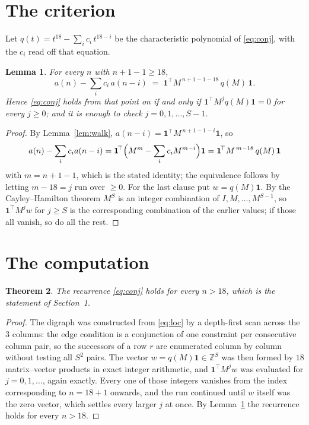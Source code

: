 \documentclass[11pt,a4paper]{article}
\theoremstyle{plain}
\newtheorem{theorem}{Theorem}
\newtheorem{lemma}[theorem]{Lemma}
\theoremstyle{definition}
\begin{document}
\section{The criterion}

Let $q(t)=t^{18}-\sum_i c_i\,t^{18-i}$ be the characteristic polynomial of
\eqref{eq:conj}, with the $c_i$ read off that equation.

\begin{lemma}\label{lem:crit}
For every $n$ with $n+1-1\ge18$,
\[
a(n)-\sum_i c_i\,a(n-i)\;=\;\mathbf{1}^{\!\top}M^{\,n+1-1-18}\,q(M)\,\mathbf{1} .
\]
Hence \eqref{eq:conj} holds from that point on if and only if
$\mathbf{1}^{\!\top}M^{j}q(M)\mathbf{1}=0$ for every $j\ge0$; and it is enough to check
$j=0,1,\dots,S-1$.
\end{lemma}

\begin{proof}
By Lemma~\ref{lem:walk}, $a(n-i)=\mathbf{1}^{\!\top}M^{\,n+1-1-i}\mathbf{1}$, so
\[
a(n)-\sum_i c_i a(n-i)
=\mathbf{1}^{\!\top}\Bigl(M^{m}-\sum_i c_i M^{m-i}\Bigr)\mathbf{1}
=\mathbf{1}^{\!\top}M^{\,m-18}\,q(M)\,\mathbf{1}
\]
with $m=n+1-1$, which is the stated identity; the equivalence follows by letting
$m-18=j$ run over $\ge0$. For the last clause put $w=q(M)\mathbf{1}$. By the
Cayley--Hamilton theorem $M^{S}$ is an integer combination of $I,M,\dots,M^{S-1}$, so
$\mathbf{1}^{\!\top}M^{j}w$ for $j\ge S$ is the corresponding combination of the earlier
values; if those all vanish, so do all the rest.
\end{proof}

\section{The computation}

\begin{theorem}
The recurrence \eqref{eq:conj} holds for every $n>18$, which is the statement of
Section~1.
\end{theorem}

\begin{proof}
The digraph was constructed from \eqref{eq:loc} by a depth-first scan across the $3$
columns: the edge condition is a conjunction of one constraint per consecutive column
pair, so the successors of a row $r$ are enumerated column by column without testing all
$S^2$ pairs. The vector $w=q(M)\mathbf{1}\in\mathbb{Z}^{S}$ was then formed by $18$
matrix--vector products in exact integer arithmetic, and $\mathbf{1}^{\!\top}M^{j}w$ was
evaluated for $j=0,1,\dots$, again exactly. Every one of those integers vanishes from the
index corresponding to $n=18+1$ onwards, and the run continued until $w$ itself was the
zero vector, which settles every larger $j$ at once. By Lemma~\ref{lem:crit} the recurrence
holds for every $n>18$.
\end{proof}
\end{document}
